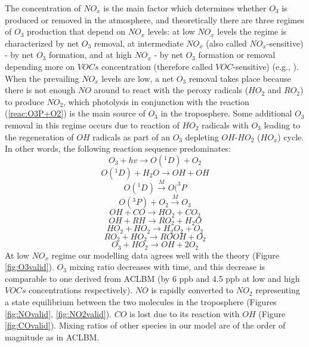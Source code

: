 \documentclass[11pt,a4paper]{article}
\begin{document}
The concentration of $NO_x$ is the main factor which determines whether $O_3$ is produced or removed in the atmosphere, and theoretically there are three regimes of $O_3$ production that depend on $NO_x$ levels: at low $NO_x$ levels the regime is characterized by net $O_3$ removal, at intermediate $NO_x$ (also called $NO_x$-sensitive) - by net $O_3$ formation, and at high $NO_x$ - by net $O_3$ formation or removal depending more on $VOCs$ concentration (therefore called $VOC$-sensitive) (e.g., \citep{Fowler2008}). When the prevailing $NO_x$ levels are low, a net $O_3$ removal takes place because there is not enough $NO$ around to react with the peroxy radicals ($HO_2$ and $RO_2$) to produce $NO_2$, which photolysis in conjunction with the reaction (\ref{reac:O3P+O2}) is the main source of $O_3$ in the troposphere. Some additional $O_3$ removal in this regime occurs due to reaction of $HO_2$ radicals with $O_3$ leading to the regeneration of $OH$ radicals as part of an $O_3$ depleting $OH$-$HO_2$ ($HO_x$) cycle. In other words, the following reaction sequence predominates:
\begin{equation}\label{reac:O3+hv}
O_3 + hv \rightarrow O(^1D) + O_2
\end{equation}
\begin{equation}\label{reac:O1D+H2O}
O(^1D) + H_2O \rightarrow OH + OH
\end{equation}
\begin{equation}\label{reac:O1D=O3P}
O(^1D) \xrightarrow{M} O(^3P
\end{equation}
\begin{equation}\label{reac:O3P+O2}
O(^3P) + O_2 \xrightarrow{M} O_3
\end{equation}
\begin{equation}\label{reac:OH+CO}
OH + CO \rightarrow HO_2 + CO_2
\end{equation}
\begin{equation}\label{reac:OH+RH}
OH + RH \rightarrow RO_2 + H_2O
\end{equation}
\begin{equation}\label{reac:HO2+HO2}
HO_2 + HO_2 \rightarrow H_2O_2 + O_2
\end{equation}
\begin{equation}\label{reac:RO2+HO2}
RO_2 + HO_2 \rightarrow ROOH + O_2
\end{equation}
\begin{equation}\label{reac:O3+HO2}
O_3 + HO_2 \rightarrow OH + 2O_2
\end{equation}
At low $NO_x$ regime our modelling data agrees well with the theory (Figure \ref{fig:O3valid}). $O_3$ mixing ratio decreases with time, and this decrease is comparable to one derived from ACLBM (by 6 ppb and 4.5 ppb at low and high $VOCs$ concentrations respectively). $NO$ is rapidly converted to $NO_2$ representing a state equilibrium between the two molecules in the troposphere (Figures \ref{fig:NOvalid}, \ref{fig:NO2valid}). $CO$ is lost due to its reaction with $OH$ (Figure \ref{fig:COvalid}). Mixing ratios of other species in our model are of the order of magnitude as in ACLBM.
\end{document}
